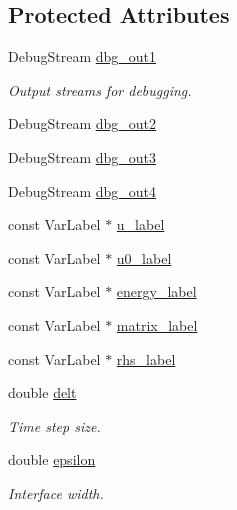 \subsection*{Protected Attributes}
\begin{DoxyCompactItemize}
\item 
Debug\+Stream \hyperlink{classUintah_1_1PhaseField_1_1Benchmark01_a508ea7b52d7b955a31f48d3769a3171a}{dbg\+\_\+out1}
\begin{DoxyCompactList}\small\item\em Output streams for debugging. \end{DoxyCompactList}\item 
Debug\+Stream \hyperlink{classUintah_1_1PhaseField_1_1Benchmark01_afd6848f35441c7a958306800d00a3750}{dbg\+\_\+out2}
\item 
Debug\+Stream \hyperlink{classUintah_1_1PhaseField_1_1Benchmark01_a341ce0901f446ac5cd2970c164ae367f}{dbg\+\_\+out3}
\item 
Debug\+Stream \hyperlink{classUintah_1_1PhaseField_1_1Benchmark01_a9fd3b73d5c205c9f4d42f47d417ddae8}{dbg\+\_\+out4}
\item 
const Var\+Label $\ast$ \hyperlink{classUintah_1_1PhaseField_1_1Benchmark01_a94ce522995ca326e88fc0b0320758adc}{u\+\_\+label}
\item 
const Var\+Label $\ast$ \hyperlink{classUintah_1_1PhaseField_1_1Benchmark01_adb6a3a583d04f70b9f76fdaee4cc62c3}{u0\+\_\+label}
\item 
const Var\+Label $\ast$ \hyperlink{classUintah_1_1PhaseField_1_1Benchmark01_a71b25c8870acd88707f5f6471d725ec5}{energy\+\_\+label}
\item 
const Var\+Label $\ast$ \hyperlink{classUintah_1_1PhaseField_1_1Benchmark01_addfd00bbf38ab47b044cf556fdb4a67d}{matrix\+\_\+label}
\item 
const Var\+Label $\ast$ \hyperlink{classUintah_1_1PhaseField_1_1Benchmark01_a4ca92fbfb4cce0b18e28d1f14e6938e2}{rhs\+\_\+label}
\item 
double \hyperlink{classUintah_1_1PhaseField_1_1Benchmark01_ab133d370fe0ddb7fdf0f53aaba4a640a}{delt}
\begin{DoxyCompactList}\small\item\em Time step size. \end{DoxyCompactList}\item 
double \hyperlink{classUintah_1_1PhaseField_1_1Benchmark01_a4c4be4f9dd310e6ab85ca1b83826a84a}{epsilon}
\begin{DoxyCompactList}\small\item\em Interface width. \end{DoxyCompactList}\end{DoxyCompactItemize}

